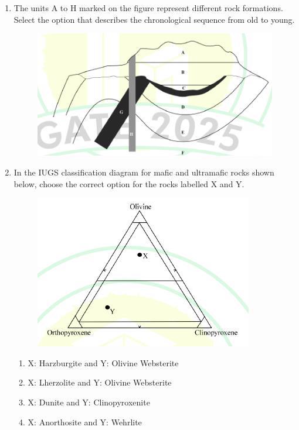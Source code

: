 \documentclass[journal,12pt,onecolumn]{IEEEtran}
\theoremstyle{remark}
\begin{document}
\begin{enumerate}
\item The units A to H marked on the figure represent different rock formations. Select the option that describes the chronological sequence from old to young.
\begin{figure}[H]
    \centering
    \includegraphics[width=0.7\columnwidth]{figs/fig9.png}
    \caption{}
    \label{fig:q50}
\end{figure}
\hfill{}
\begin{enumerate}
\end{enumerate}

\item In the IUGS classification diagram for mafic and ultramafic rocks shown below, choose the correct option for the rocks labelled X and Y.
\begin{figure}[H]
    \centering
    \includegraphics[width=0.6\columnwidth]{figs/fig10.png}
    \caption{}
    \label{fig:q51}
\end{figure}
\hfill{}
\begin{enumerate}
    \item X: Harzburgite and Y: Olivine Websterite
    \item X: Lherzolite and Y: Olivine Websterite
    \item X: Dunite and Y: Clinopyroxenite
    \item X: Anorthosite and Y: Wehrlite
\end{enumerate}


\end{enumerate}
\end{document}
